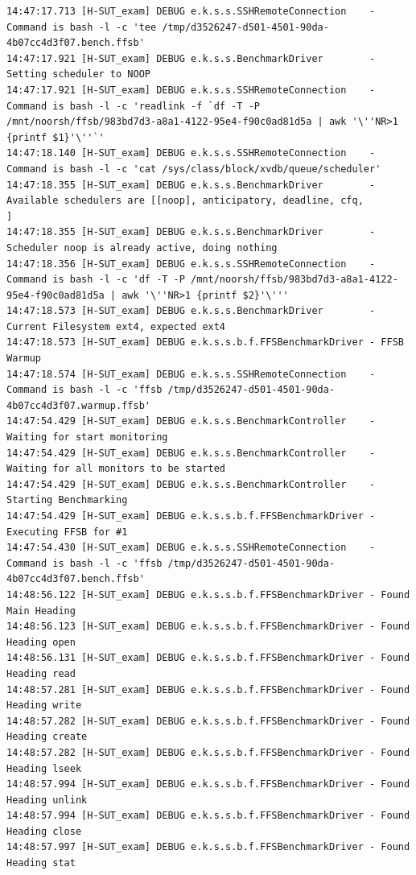 \begin{lstlisting}
14:47:17.713 [H-SUT_exam] DEBUG e.k.s.s.SSHRemoteConnection    - Command is bash -l -c 'tee /tmp/d3526247-d501-4501-90da-4b07cc4d3f07.bench.ffsb'
14:47:17.921 [H-SUT_exam] DEBUG e.k.s.s.BenchmarkDriver        - Setting scheduler to NOOP
14:47:17.921 [H-SUT_exam] DEBUG e.k.s.s.SSHRemoteConnection    - Command is bash -l -c 'readlink -f `df -T -P /mnt/noorsh/ffsb/983bd7d3-a8a1-4122-95e4-f90c0ad81d5a | awk '\''NR>1 {printf $1}'\''`'
14:47:18.140 [H-SUT_exam] DEBUG e.k.s.s.SSHRemoteConnection    - Command is bash -l -c 'cat /sys/class/block/xvdb/queue/scheduler'
14:47:18.355 [H-SUT_exam] DEBUG e.k.s.s.BenchmarkDriver        - Available schedulers are [[noop], anticipatory, deadline, cfq, 
]
14:47:18.355 [H-SUT_exam] DEBUG e.k.s.s.BenchmarkDriver        - Scheduler noop is already active, doing nothing
14:47:18.356 [H-SUT_exam] DEBUG e.k.s.s.SSHRemoteConnection    - Command is bash -l -c 'df -T -P /mnt/noorsh/ffsb/983bd7d3-a8a1-4122-95e4-f90c0ad81d5a | awk '\''NR>1 {printf $2}'\'''
14:47:18.573 [H-SUT_exam] DEBUG e.k.s.s.BenchmarkDriver        - Current Filesystem ext4, expected ext4
14:47:18.573 [H-SUT_exam] DEBUG e.k.s.s.b.f.FFSBenchmarkDriver - FFSB Warmup
14:47:18.574 [H-SUT_exam] DEBUG e.k.s.s.SSHRemoteConnection    - Command is bash -l -c 'ffsb /tmp/d3526247-d501-4501-90da-4b07cc4d3f07.warmup.ffsb'
14:47:54.429 [H-SUT_exam] DEBUG e.k.s.s.BenchmarkController    - Waiting for start monitoring
14:47:54.429 [H-SUT_exam] DEBUG e.k.s.s.BenchmarkController    - Waiting for all monitors to be started
14:47:54.429 [H-SUT_exam] DEBUG e.k.s.s.BenchmarkController    - Starting Benchmarking
14:47:54.429 [H-SUT_exam] DEBUG e.k.s.s.b.f.FFSBenchmarkDriver - Executing FFSB for #1
14:47:54.430 [H-SUT_exam] DEBUG e.k.s.s.SSHRemoteConnection    - Command is bash -l -c 'ffsb /tmp/d3526247-d501-4501-90da-4b07cc4d3f07.bench.ffsb'
14:48:56.122 [H-SUT_exam] DEBUG e.k.s.s.b.f.FFSBenchmarkDriver - Found Main Heading
14:48:56.123 [H-SUT_exam] DEBUG e.k.s.s.b.f.FFSBenchmarkDriver - Found Heading open
14:48:56.131 [H-SUT_exam] DEBUG e.k.s.s.b.f.FFSBenchmarkDriver - Found Heading read
14:48:57.281 [H-SUT_exam] DEBUG e.k.s.s.b.f.FFSBenchmarkDriver - Found Heading write
14:48:57.282 [H-SUT_exam] DEBUG e.k.s.s.b.f.FFSBenchmarkDriver - Found Heading create
14:48:57.282 [H-SUT_exam] DEBUG e.k.s.s.b.f.FFSBenchmarkDriver - Found Heading lseek
14:48:57.994 [H-SUT_exam] DEBUG e.k.s.s.b.f.FFSBenchmarkDriver - Found Heading unlink
14:48:57.994 [H-SUT_exam] DEBUG e.k.s.s.b.f.FFSBenchmarkDriver - Found Heading close
14:48:57.997 [H-SUT_exam] DEBUG e.k.s.s.b.f.FFSBenchmarkDriver - Found Heading stat

\end{lstlisting}
